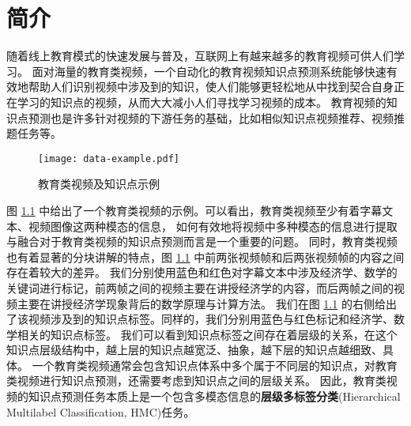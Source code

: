 
\chapter{简介}
    随着线上教育模式的快速发展与普及，互联网上有越来越多的教育视频可供人们学习。
    面对海量的教育类视频，一个自动化的教育视频知识点预测系统能够快速有效地帮助人们识别视频中涉及到的知识，使人们能够更轻松地从中找到契合自身正在学习的知识点的视频，从而大大减小人们寻找学习视频的成本。
    教育视频的知识点预测也是许多针对视频的下游任务的基础，比如相似知识点视频推荐、视频推题任务等。

    \begin{figure}[t]
        \centering
        \texttt{[image: data-example.pdf]}
        \caption{教育类视频及知识点示例}
        \label{fig1.1}
    \end{figure}

    图 \ref{fig1.1} 中给出了一个教育类视频的示例。可以看出，教育类视频至少有着字幕文本、视频图像这两种模态的信息，
    如何有效地将视频中多种模态的信息进行提取与融合对于教育类视频的知识点预测而言是一个重要的问题。
    同时，教育类视频也有着显著的分块讲解的特点，图 \ref{fig1.1} 中前两张视频帧和后两张视频帧的内容之间存在着较大的差异。
    我们分别使用蓝色和红色对字幕文本中涉及经济学、数学的关键词进行标记，前两帧之间的视频主要在讲授经济学的内容，而后两帧之间的视频主要在讲授经济学现象背后的数学原理与计算方法。
    我们在图 \ref{fig1.1} 的右侧给出了该视频涉及到的知识点标签。同样的，我们分别用蓝色与红色标记和经济学、数学相关的知识点标签。
    我们可以看到知识点标签之间存在着层级的关系，在这个知识点层级结构中，越上层的知识点越宽泛、抽象，越下层的知识点越细致、具体。
    一个教育类视频通常会包含知识点体系中多个属于不同层的知识点，对教育类视频进行知识点预测，还需要考虑到知识点之间的层级关系。
    因此，教育类视频的知识点预测任务本质上是一个包含多模态信息的\textbf{层级多标签分类}(Hierarchical Multilabel Classification, HMC)任务。

